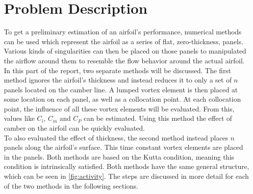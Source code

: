 \newcommand{\numfoil}{$\boldsymbol{\Gamma}$\textbf{py}\ }
\chapter{Problem Description}
To get a preliminary estimation of an airfoil's performance, numerical methods
can be used which represent the airfoil as a series of flat, zero-thickness,
panels. Various kinds of singularities can then be placed on those panels to
manipulated the airflow around them to resemble the flow behavior around the
actual airfoil.\\

In this part of the report, two separate methods will be discussed.
The first method ignores the airfoil's thickness and instead reduces it to only
a set of $n$ panels located on the camber line. A lumped vortex element is then
placed at some location on each panel, as well as a collocation point. At each
collocation point, the influence of all these vortex elements will be evaluated.
From this, values like $C_l$, $C_m$ and $C_P$ can be estimated. Using this
method the effect of camber on the airfoil can be quickly evaluated.\\

To also evaluated the effect of thickness, the second method instead places $n$
panels along the airfoil's surface. This time constant vortex elements are
placed in the panels.
Both methods are based on the Kutta condition, meaning this condition is
intrinsically satisfied. Both methods have the same general structure, which can
be seen in \autoref{fig:activity}. The steps are discussed in more detail
for each of the two methods in the following sections.


